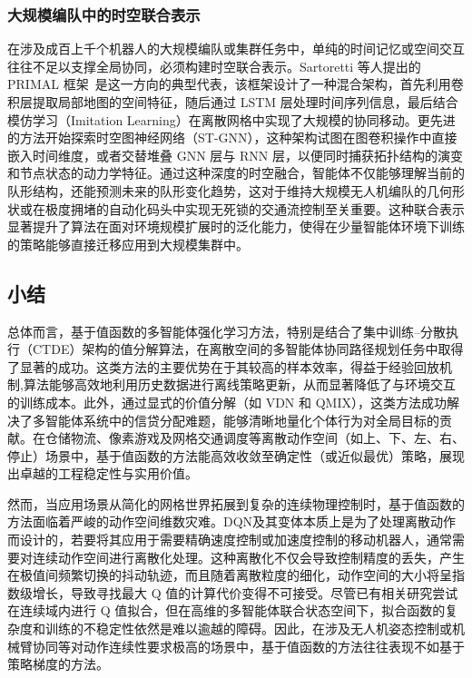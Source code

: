 \documentclass[13.5pt]{extarticle}
\begin{document}
\subsubsection{大规模编队中的时空联合表示}

在涉及成百上千个机器人的大规模编队或集群任务中，单纯的时间记忆或空间交互往往不足以支撑全局协同，必须构建时空联合表示。Sartoretti 等人提出的 PRIMAL 框架~\cite{sartoretti2019primal}是这一方向的典型代表，该框架设计了一种混合架构，首先利用卷积层提取局部地图的空间特征，随后通过 LSTM 层处理时间序列信息，最后结合模仿学习（Imitation Learning）在离散网格中实现了大规模的协同移动。更先进的方法开始探索时空图神经网络（ST-GNN），这种架构试图在图卷积操作中直接嵌入时间维度，或者交替堆叠 GNN 层与 RNN 层，以便同时捕获拓扑结构的演变和节点状态的动力学特征。通过这种深度的时空融合，智能体不仅能够理解当前的队形结构，还能预测未来的队形变化趋势，这对于维持大规模无人机编队的几何形状或在极度拥堵的自动化码头中实现无死锁的交通流控制至关重要。这种联合表示显著提升了算法在面对环境规模扩展时的泛化能力，使得在少量智能体环境下训练的策略能够直接迁移应用到大规模集群中。

\subsection{小结}

总体而言，基于值函数的多智能体强化学习方法，特别是结合了集中训练–分散执行（CTDE）架构的值分解算法，在离散空间的多智能体协同路径规划任务中取得了显著的成功。这类方法的主要优势在于其较高的样本效率，得益于经验回放机制,算法能够高效地利用历史数据进行离线策略更新，从而显著降低了与环境交互的训练成本。此外，通过显式的价值分解（如 VDN 和 QMIX），这类方法成功解决了多智能体系统中的信贷分配难题，能够清晰地量化个体行为对全局目标的贡献。在仓储物流、像素游戏及网格交通调度等离散动作空间（如上、下、左、右、停止）场景中，基于值函数的方法能高效收敛至确定性（或近似最优）策略，展现出卓越的工程稳定性与实用价值。

然而，当应用场景从简化的网格世界拓展到复杂的连续物理控制时，基于值函数的方法面临着严峻的动作空间维数灾难。DQN及其变体本质上是为了处理离散动作而设计的，若要将其应用于需要精确速度控制或加速度控制的移动机器人，通常需要对连续动作空间进行离散化处理。这种离散化不仅会导致控制精度的丢失，产生在极值间频繁切换的抖动轨迹，而且随着离散粒度的细化，动作空间的大小将呈指数级增长，导致寻找最大 Q 值的计算代价变得不可接受。尽管已有相关研究尝试在连续域内进行 Q 值拟合，但在高维的多智能体联合状态空间下，拟合函数的复杂度和训练的不稳定性依然是难以逾越的障碍。因此，在涉及无人机姿态控制或机械臂协同等对动作连续性要求极高的场景中，基于值函数的方法往往表现不如基于策略梯度的方法。
\end{document}
